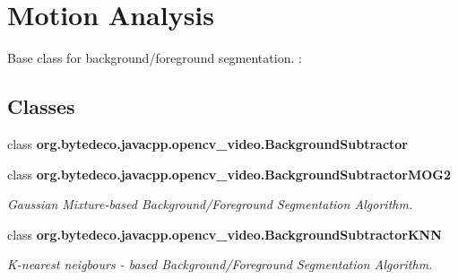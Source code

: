 \hypertarget{group__video__motion}{}\section{Motion Analysis}
\label{group__video__motion}


Base class for background/foreground segmentation. \+:  


\subsection*{Classes}
\begin{DoxyCompactItemize}
\item 
class {\bfseries org.\+bytedeco.\+javacpp.\+opencv\+\_\+video.\+Background\+Subtractor}
\item 
class {\bfseries org.\+bytedeco.\+javacpp.\+opencv\+\_\+video.\+Background\+Subtractor\+M\+O\+G2}
\begin{DoxyCompactList}\small\item\em Gaussian Mixture-\/based Background/\+Foreground Segmentation Algorithm. \end{DoxyCompactList}\item 
class {\bfseries org.\+bytedeco.\+javacpp.\+opencv\+\_\+video.\+Background\+Subtractor\+K\+NN}
\begin{DoxyCompactList}\small\item\em K-\/nearest neigbours -\/ based Background/\+Foreground Segmentation Algorithm. \end{DoxyCompactList}\end{DoxyCompactItemize}

